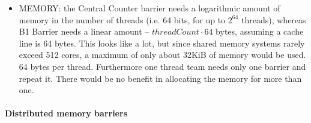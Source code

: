 \documentclass[a4paper, 10pt]{article}
\begin{document}
\begin{itemize}
	\item MEMORY: the Central Counter barrier needs a logarithmic amount of memory in the number of threads (i.e. 64 bits, for up to $2^{64}$ threads), whereas B1 Barrier needs a linear amount -- $\mathit{threadCount} \cdot 64$ bytes, assuming a cache line is 64 bytes. This looks like a lot, but since shared memory systems rarely exceed 512 cores, a maximum of only about 32KiB of memory would be used. 64 bytes per thread. Furthermore one thread team needs only one barrier and repeat it. There would be no benefit in allocating the memory for more than one.
\end{itemize}

\paragraph{Distributed memory barriers}
\label{sssec:analysis-general-distributed}
\end{document}
